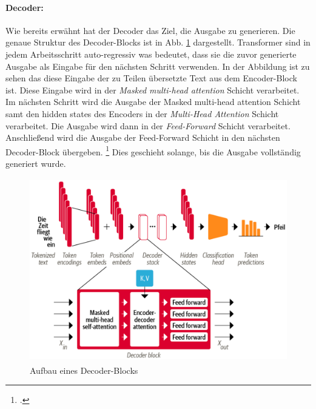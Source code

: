 \paragraph{Decoder:} 
 Wie bereits erwähnt hat der Decoder das Ziel, die Ausgabe zu generieren. Die genaue Struktur des Decoder-Blocks ist in Abb. \ref{fig:decoder-block} dargestellt. Transformer sind in jedem Arbeitsschritt auto-regressiv was bedeutet, dass sie die zuvor generierte Ausgabe als Eingabe für den nächsten Schritt verwenden. In der Abbildung ist zu sehen das diese Eingabe der zu Teilen übersetzte Text aus dem Encoder-Block ist. Diese Eingabe wird in der \emph{Masked multi-head attention} Schicht verarbeitet. Im nächsten Schritt wird die Ausgabe der Masked multi-head attention Schicht samt den hidden states des Encoders in der \emph{Multi-Head Attention} Schicht verarbeitet. Die Ausgabe wird dann in der \emph{Feed-Forward} Schicht verarbeitet. Anschließend wird die Ausgabe der Feed-Forward Schicht in den nächsten Decoder-Block übergeben. \footcites[Vgl.][S. 3 ff.]{vaswani_attention_2017} Dies geschieht solange, bis die Ausgabe vollständig generiert wurde.
 \begin{figure}[h]
    \centering
    \includegraphics[height=80mm]{graphics/decoder-block.png}
    \caption[Aufbau eines Decoder-Blocks]{Aufbau eines Decoder-Blocks \footnotemark}
    \label{fig:decoder-block}
\end{figure}

